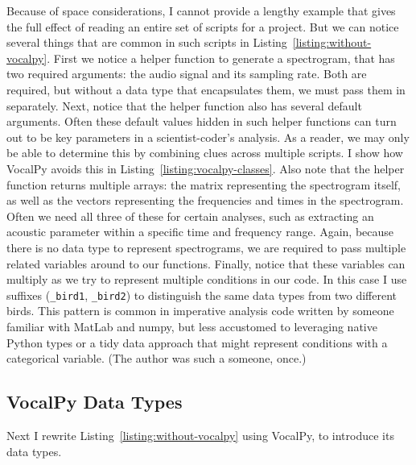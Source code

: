 \documentclass[11pt]{article}
\begin{document}
Because of space considerations, I cannot provide a lengthy example that gives the full effect of reading an entire set of scripts for a project. But we can notice several things that are common in such scripts in Listing~\ref{listing:without-vocalpy}. 
First we notice a helper function to generate a spectrogram, that has two required  arguments: the audio signal and its sampling rate. Both are required, but without a data type that encapsulates them, we must pass them in separately. Next, notice that the helper function also has several default arguments. Often these default values hidden in such helper functions can turn out to be key parameters in a scientist-coder's analysis. As a reader, we may only be able to determine this by combining clues across multiple scripts. I show how VocalPy avoids this in Listing~\ref{listing:vocalpy-classes}. Also note that the helper function returns multiple arrays: the matrix representing the spectrogram itself, as well as the vectors representing the frequencies and times in the spectrogram. Often we need all three of these for certain analyses, such as extracting an acoustic parameter within a specific time and frequency range. Again, because there is no data type to represent spectrograms, we are required to pass multiple related variables around to our functions. Finally, notice that these variables can multiply as we try to represent multiple conditions in our code. In this case I use suffixes (\texttt{\_bird1}, \texttt{\_bird2}) to distinguish the same data types from two different birds. This pattern is common in imperative analysis code written by someone familiar with MatLab and numpy, but less accustomed to leveraging native Python types or a tidy data approach that might represent conditions with a categorical variable. (The author was such a someone, once.)

\subsection{VocalPy Data Types}

Next I rewrite Listing~\ref{listing:without-vocalpy} using VocalPy, to introduce its data types. 

\end{document}
